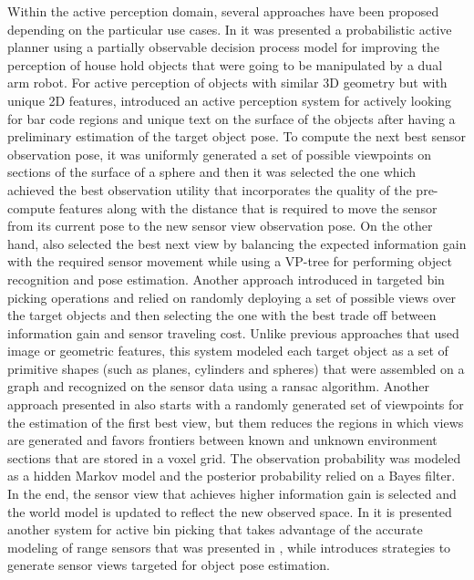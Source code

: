 Within the active perception domain, several approaches have been proposed depending on the particular use cases. In \cite{Eidenberger2010} it was presented a probabilistic active planner using a partially observable decision process model for improving the perception of house hold objects that were going to be manipulated by a dual arm robot. For active perception of objects with similar 3D geometry but with unique 2D features, \cite{Stampfer2012} introduced an active perception system for actively looking for bar code regions and unique text on the surface of the objects after having a preliminary estimation of the target object pose. To compute the next best sensor observation pose, it was uniformly generated a set of possible viewpoints on sections of the surface of a sphere and then it was selected the one which achieved the best observation utility that incorporates the quality of the pre-compute features along with the distance that is required to move the sensor from its current pose to the new sensor view observation pose. On the other hand, \cite{Atanasov2014} also selected the best next view by balancing the expected information gain with the required sensor movement while using a VP-tree for performing object recognition and pose estimation. Another approach introduced in \cite{Holz2014} targeted bin picking operations and relied on randomly deploying a set of possible views over the target objects and then selecting the one with the best trade off between information gain and sensor traveling cost. Unlike previous approaches that used image or geometric features, this system modeled each target object as a set of primitive shapes (such as planes, cylinders and spheres) that were assembled on a graph and recognized on the sensor data using a \gls{ransac} algorithm. Another approach presented in \cite{Potthast2014} also starts with a randomly generated set of viewpoints for the estimation of the first best view, but them reduces the regions in which views are generated and favors frontiers between known and unknown environment sections that are stored in a voxel grid. The observation probability was modeled as a hidden Markov model and the posterior probability relied on a Bayes filter. In the end, the sensor view that achieves higher information gain is selected and the world model is updated to reflect the new observed space. In \cite{Mezei2016} it is presented another system for active bin picking that takes advantage of the accurate modeling of range sensors that was presented in \cite{Gschwandtner2011}, while \cite{Hu2022} introduces strategies to generate sensor views targeted for object pose estimation.


